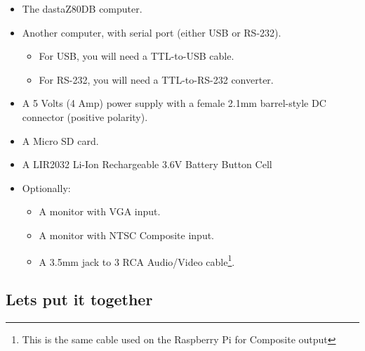 \begin{itemize}
    \item The dastaZ80DB computer.
    \item Another computer, with serial port (either USB or RS-232).
    \begin{itemize}
        \item For USB, you will need a TTL-to-USB cable.
        \item For RS-232, you will need a TTL-to-RS-232 converter.
    \end{itemize}
    \item A 5 Volts (4 Amp) power supply with a female 2.1mm barrel-style DC
    connector (positive polarity).
    \item A Micro SD card.
    \item A LIR2032 Li-Ion Rechargeable 3.6V Battery Button Cell
    \item Optionally:
    \begin{itemize}
        \item A monitor with VGA input.
        \item A monitor with NTSC Composite input.
        \item A 3.5mm jack to 3 RCA Audio/Video cable\footnote{This is the same
            cable used on the Raspberry Pi for Composite output}.
    \end{itemize}
\end{itemize}

\subsection{Lets put it together}

